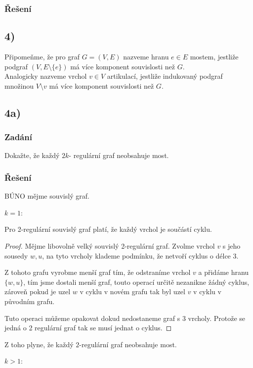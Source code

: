 \documentclass[../main.tex]{subfiles}
\begin{document}
\subsubsection*{Řešení}


\subsection{4)}
Připomeňme, že pro graf $G=(V,E)$ nazveme hranu $e\in E$ mostem, jestliže podgraf $(V,E\setminus\{e\})$ má více komponent souvislosti než $G$.\\
Analogicky nazveme vrchol $v\in V$ artikulací, jestliže indukovaný podgraf množinou $V\setminus{v}$ má více komponent souvislosti než $G$.

\subsection{4a)}
\subsubsection*{Zadání}
Dokažte, že každý $2k$- regulární graf neobsahuje most.
\subsubsection*{Řešení}

BÚNO mějme souvislý graf. 

$k = 1$:
\begin{lemma*}
    Pro 2-regulární souvislý graf platí, že každý vrchol je součástí cyklu. 
\end{lemma*}
\begin{proof}
    Mějme libovolně velký souvislý 2-regulární graf. 
    Zvolme vrchol $v$ s jeho sousedy $w,u$, 
    na tyto vrcholy klademe podmínku, že netvoří cyklus o délce 3. 
    
    Z tohoto grafu vyrobme menší graf tím, že odstraníme vrchol $v$ a přidáme hranu $\{w,u\}$, tím jsme dostali menší graf, touto operací určitě nezanikne žádný cyklus, zároveň pokud je uzel $w$ v cyklu v novém grafu tak byl uzel $v$  v cyklu v původním grafu. 
    
    Tuto operaci můžeme opakovat dokud nedostaneme graf s 3 vrcholy. Protože se jedná o 2 regulární graf tak se musí jednat o cyklus. 
\end{proof}

Z toho plyne, že každý $2$-regulární graf neobsahuje  most. 

$k>1$:
\end{document}
